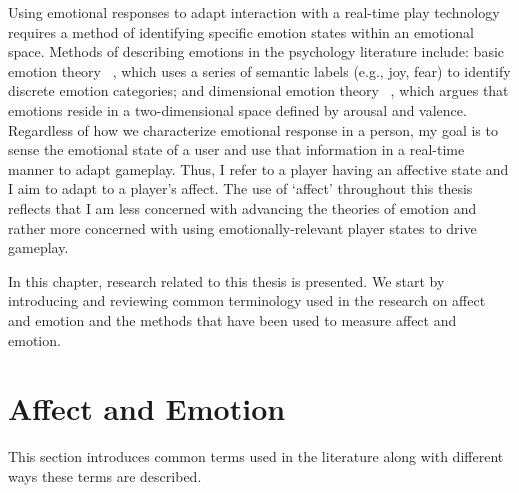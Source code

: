 

Using emotional responses to adapt interaction with a real-time play technology requires a method of identifying specific emotion states within an emotional space. Methods of describing emotions in the psychology literature include: basic emotion theory ~\cite{ekman1992argument, ekman1992there}, which uses a series of semantic labels (e.g., joy, fear) to identify discrete emotion categories; and dimensional emotion theory ~\cite{lang1995emotion, russell1989affect}, which argues that emotions reside in a two-dimensional space defined by arousal and valence. Regardless of how we characterize emotional response in a person, my goal is to sense the emotional state of a user and use that information in a real-time manner to adapt gameplay. Thus, I refer to a player having an affective state and I aim to adapt to a player's affect. The use of `affect' throughout this thesis reflects that I am less concerned with advancing the theories of emotion and rather more concerned with using emotionally-relevant player states to drive gameplay.

In this chapter, research related to this thesis is presented. We start by introducing and reviewing common terminology used in the research on affect and emotion and the methods that have been used to measure affect and emotion.


\section{Affect and Emotion}

This section introduces common terms used in the literature along with different ways these terms are described.

